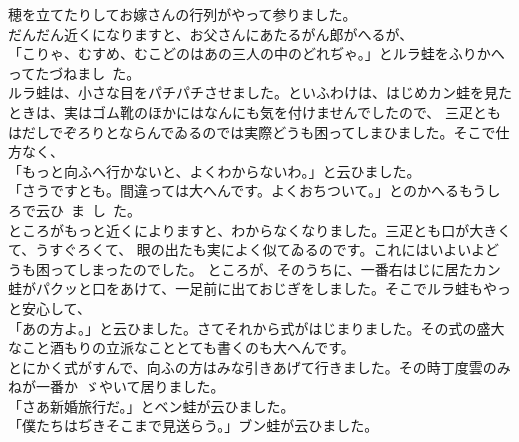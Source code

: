 \documentclass[
a4paper,
10pt,
book]
{tarticle}
\begin{document}
\begin{linenumbers}
    穂を立てたりしてお嫁さんの行列がやって参りました。\\
    \indent だんだん近くになりますと、お父さんにあたるがん郎がへるが、\\
    「こりゃ、むすめ、むこどのはあの三人の中のどれぢゃ。」とルラ蛙をふりかへってたづねまし~た。\\
    \indent ルラ蛙は、小さな目をパチパチさせました。といふわけは、はじめカン蛙を見たときは、実はゴム靴のほかにはなんにも気を付けませんでしたので、
    三疋ともはだしでぞろりとならんでゐるのでは実際どうも困ってしまひました。そこで仕方なく、\\
    「もっと向ふへ行かないと、よくわからないわ。」と云ひました。\\
    「さうですとも。間違っては大へんです。よくおちついて。」とのかへるもうしろで云ひ~ま~し~た。\\
    \indent ところがもっと近くによりますと、わからなくなりました。三疋とも口が大きくて、うすぐろくて、
    眼の出たも実によく似てゐるのです。これにはいよいよどうも困ってしまったのでした。
    ところが、そのうちに、一番右はじに居たカン蛙がパクッと口をあけて、一足前に出ておじぎをしました。そこでルラ蛙もやっと安心して、\\
    「あの方よ。」と云ひました。さてそれから式がはじまりました。その式の盛大なこと酒もりの立派なこととても書くのも大へんです。\\
    \indent とにかく式がすんで、向ふの方はみな引きあげて行きました。その時丁度雲のみねが一番か~ゞやいて居りました。\\
    「さあ新婚旅行だ。」とベン蛙が云ひました。\\
    「僕たちはぢきそこまで見送らう。」ブン蛙が云ひました。
\end{linenumbers}
\end{document}
